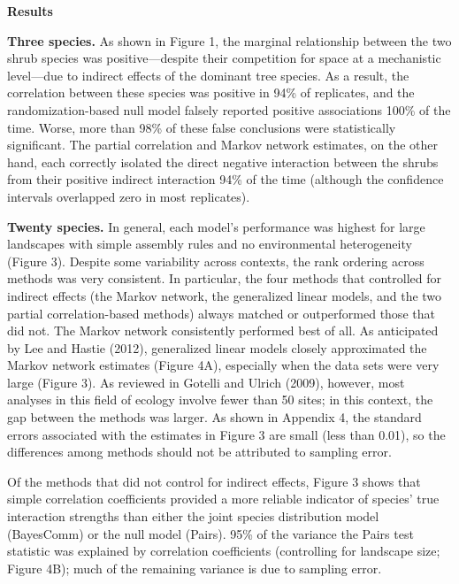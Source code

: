 \documentclass[12pt,]{article}
\begin{document}
\begin{spacing}{1.9}
\begin{flushleft}
\noindent
\textbf{Results}

\noindent \textbf{Three species.} As shown in Figure 1, the marginal
relationship between the two shrub species was positive---despite their
competition for space at a mechanistic level---due to indirect effects
of the dominant tree species. As a result, the correlation between these
species was positive in 94\% of replicates, and the randomization-based
null model falsely reported positive associations 100\% of the time.
Worse, more than 98\% of these false conclusions were statistically
significant. The partial correlation and Markov network estimates, on
the other hand, each correctly isolated the direct negative interaction
between the shrubs from their positive indirect interaction 94\% of the
time (although the confidence intervals overlapped zero in most
replicates).

\noindent
\textbf{Twenty species.} In general, each model's performance was
highest for large landscapes with simple assembly rules and no
environmental heterogeneity (Figure 3). Despite some variability across
contexts, the rank ordering across methods was very consistent. In
particular, the four methods that controlled for indirect effects (the
Markov network, the generalized linear models, and the two partial
correlation-based methods) always matched or outperformed those that did
not. The Markov network consistently performed best of all. As
anticipated by Lee and Hastie (2012), generalized linear models closely
approximated the Markov network estimates (Figure 4A), especially when
the data sets were very large (Figure 3). As reviewed in Gotelli and
Ulrich (2009), however, most analyses in this field of ecology involve
fewer than 50 sites; in this context, the gap between the methods was
larger. As shown in Appendix 4, the standard errors associated with the
estimates in Figure 3 are small (less than 0.01), so the differences
among methods should not be attributed to sampling error.

Of the methods that did not control for indirect effects, Figure 3 shows
that simple correlation coefficients provided a more reliable indicator
of species' true interaction strengths than either the joint species
distribution model (BayesComm) or the null model (Pairs). 95\% of the
variance the Pairs test statistic was explained by correlation
coefficients (controlling for landscape size; Figure 4B); much of the
remaining variance is due to sampling error.


\end{flushleft}
\end{spacing}
\end{document}
